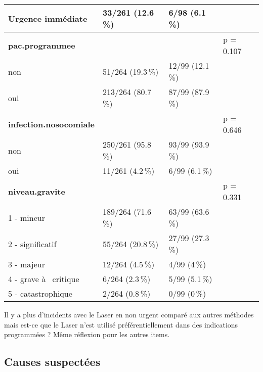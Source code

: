 \documentclass[a4paper,fontsize=10pt,french]{scrartcl}
\begin{document}
\begin{longtable}[t]{l|l|l|l}
Urgence immédiate & 33/261 (12.6\,\%) & 6/98 (6.1\,\%) & \\
\midrule
\textbf{pac.programmee} &  &  & p = 0.107\\
 
non & 51/264 (19.3\,\%) & 12/99 (12.1\,\%) & \\
 
oui & 213/264 (80.7\,\%) & 87/99 (87.9\,\%) & \\
\midrule
\textbf{infection.nosocomiale} &  &  & p = 0.646\\
 
non & 250/261 (95.8\,\%) & 93/99 (93.9\,\%) & \\
 
oui & 11/261 (4.2\,\%) & 6/99 (6.1\,\%) & \\
\midrule
\textbf{niveau.gravite} &  &  & p = 0.331\\
 
1 - mineur & 189/264 (71.6\,\%) & 63/99 (63.6\,\%) & \\
 
2 - significatif & 55/264 (20.8\,\%) & 27/99 (27.3\,\%) & \\
 
3 - majeur & 12/264 (4.5\,\%) & 4/99 (4\,\%) & \\
 
4 - grave à  critique & 6/264 (2.3\,\%) & 5/99 (5.1\,\%) & \\
 
5 - catastrophique & 2/264 (0.8\,\%) & 0/99 (0\,\%) & \\
\end{longtable}


Il y a plus d'incidents avec le Laser en non urgent comparé aux autres
méthodes mais est-ce que le Laser n'est utilisé préférentiellement dans
des indications programmées ? Même réflexion pour les autres items.

\subsection{Causes suspectées}\label{causes-suspectuxe9es}
\end{document}
